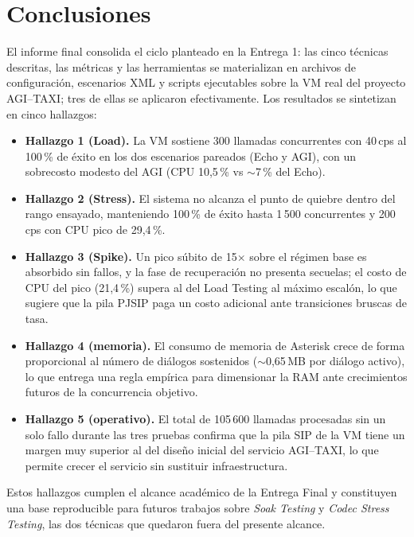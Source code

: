 \documentclass[conference]{IEEEtran}
\begin{document}
\FloatBarrier
\section{Conclusiones}

El informe final consolida el ciclo planteado en la Entrega 1: las
cinco t\'ecnicas descritas, las m\'etricas y las herramientas se
materializan en archivos de configuraci\'on, escenarios XML y scripts
ejecutables sobre la VM real del proyecto AGI--TAXI; tres de ellas se
aplicaron efectivamente. Los resultados se sintetizan en cinco
hallazgos:

\begin{itemize}
    \item \textbf{Hallazgo 1 (Load).} La VM sostiene 300 llamadas
    concurrentes con 40\,cps al 100\,\% de \'exito en los dos
    escenarios pareados (Echo y AGI), con un sobrecosto modesto del
    AGI (CPU 10{,}5\,\% vs $\sim$7\,\% del Echo).
    \item \textbf{Hallazgo 2 (Stress).} El sistema no alcanza el punto
    de quiebre dentro del rango ensayado, manteniendo 100\,\% de
    \'exito hasta 1\,500 concurrentes y 200\,cps con CPU pico de
    29{,}4\,\%.
    \item \textbf{Hallazgo 3 (Spike).} Un pico s\'ubito de 15$\times$
    sobre el r\'egimen base es absorbido sin fallos, y la fase de
    recuperaci\'on no presenta secuelas; el costo de CPU del pico
    (21{,}4\,\%) supera al del Load Testing al m\'aximo escal\'on, lo
    que sugiere que la pila PJSIP paga un costo adicional ante
    transiciones bruscas de tasa.
    \item \textbf{Hallazgo 4 (memoria).} El consumo de memoria de
    Asterisk crece de forma proporcional al n\'umero de di\'alogos
    sostenidos ($\sim$0{,}65\,MB por di\'alogo activo), lo que entrega
    una regla emp\'irica para dimensionar la RAM ante crecimientos
    futuros de la concurrencia objetivo.
    \item \textbf{Hallazgo 5 (operativo).} El total de 105\,600
    llamadas procesadas sin un solo fallo durante las tres pruebas
    confirma que la pila SIP de la VM tiene un margen muy superior al
    del dise\~no inicial del servicio AGI--TAXI, lo que permite
    crecer el servicio sin sustituir infraestructura.
\end{itemize}

\noindent Estos hallazgos cumplen el alcance acad\'emico de la Entrega
Final y constituyen una base reproducible para futuros trabajos sobre
\textit{Soak Testing} y \textit{Codec Stress Testing}, las dos
t\'ecnicas que quedaron fuera del presente alcance.
\end{document}
